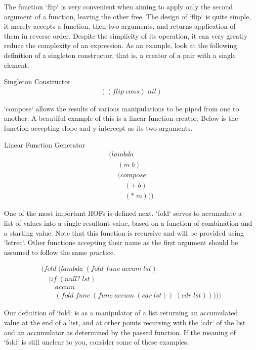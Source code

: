 \documentclass[11pt]{article}
\begin{document}
The function `flip` is very convenient when aiming to apply only the second argument of a function, leaving the other free. The design of `flip` is quite simple, it merely accepts a function, then two arguments, and returns application of them in reverse order. Despite the simplicity of its operation, it can very greatly reduce the complexity of an expression. As an example, look at the following definition of a singleton constructor, that is, a creator of a pair with a single element.

Singleton Constructor
\begin{align*}
& ((flip \; cons) \; nil)
\end{align*}


`compose` allows the results of various manipulations to be piped from one to another. A beautiful example of this is a linear function creator. Below is the function accepting slope and y-intercept as its two arguments.

Linear Function Generator
\begin{align*}
& (lambda \; 
\\& \quad \; (m \; b) \; 
\\& \quad \; (compose \; 
\\& \qquad \; (+ \; b) \; 
\\& \qquad \; (* \; m)))
\end{align*}

One of the most important HOFs is defined next. `fold` serves to accumulate a list of values into a single resultant value, based on a function of combination and a starting value. Note that this function is recursive and will be provided using `letrec`. Other functions accepting their name as the first argument should be assumed to follow the same practice.

\begin{align*}
& (fold \; (lambda \; (fold \; func \; accum \; lst)
\\& \quad (if \; (null? \; lst)
\\& \qquad accum
\\& \qquad (fold \; func \; (func \; accum \; (car \; lst)) \; (cdr \; lst)))))
\end{align*}

Our definition of `fold` is as a manipulator of a list returning an accumulated value at the end of a list, and at other points recursing with the `cdr` of the list and an accumulator as determined by the passed function. If the meaning of `fold` is still unclear to you, consider some of these examples.
\end{document}
